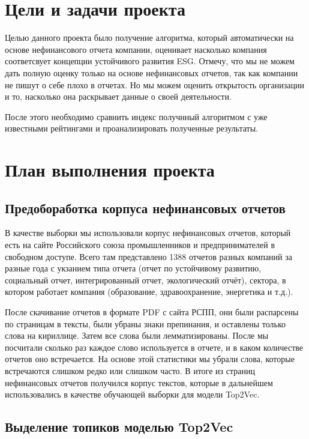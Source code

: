 \documentclass[a4paper, 14pt]{extarticle}
\begin{document}
\section{Цели и задачи проекта}
Целью данного проекта было получение алгоритма, который автоматически на основе нефинансового отчета компании, оценивает насколько компания соответсвует концепции устойчивого развития ESG. Отмечу, что мы не можем дать полную оценку только на основе нефинансовых отчетов, так как компании не пишут о себе плохо в отчетах. Но мы можем оценить открытость организации и то, насколько она раскрывает данные о своей деятельности.

После этого необходимо сравнить индекс получнный алгоритмом с уже известными рейтингами и проанализировать полученные результаты.

\section{План выполнения проекта}
\subsection{Предобоработка корпуса нефинансовых отчетов}

В качестве выборки мы использовали корпус нефинансовых отчетов, который есть на сайте Российского союза
промышленников и предпринимателей в свободном доступе. Всего там представлено 1388 отчетов разных компаний за разные года с укзанием типа отчета (отчет по устойчивому развитию, социальный отчет, интегрированный отчет, экологический отчёт), сектора, в котором работает компания (образование, здравоохранение, энергетика и т.д.). 

После скачивание отчетов в формате PDF с сайта РСПП, они были распарсены по страницам в тексты, были убраны знаки препинания, и оставлены только слова на кириллице. Затем все слова были лемматизированы. После мы посчитали сколько раз каждое слово используется в отчете, и в каком количестве отчетов оно встречается. На основе этой статистики мы убрали слова, которые встречаются слишком редко или слишком часто. В итоге из страниц нефинансовых отчетов получился корпус текстов, которые в дальнейшем использовались в качестве обучающей выборки для модели Top2Vec.  

\subsection{Выделение топиков моделью Top2Vec}
\end{document}
